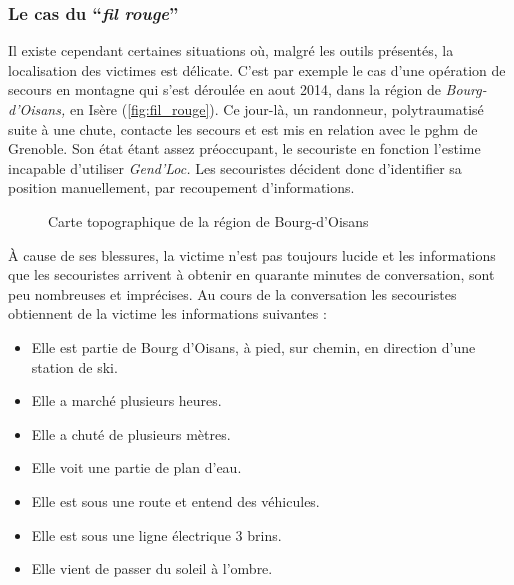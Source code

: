 \subsubsection{Le cas du \enquote{\emph{fil rouge}}}
\label{subsec:1-1-2-3}

Il existe cependant certaines situations où, malgré les outils
présentés, la localisation des victimes est délicate. C'est par
exemple le cas d'une opération de secours en montagne qui s'est
déroulée en aout 2014, dans la région de \emph{Bourg-d'Oisans,} en
Isère (\autoref{fig:fil_rouge}). Ce jour-là, un randonneur,
polytraumatisé suite à une chute, contacte les secours et est mis en
relation avec le \ac{pghm} de Grenoble. Son état étant assez
préoccupant, le secouriste en fonction l'estime incapable d'utiliser
\emph{Gend'Loc.} Les secouristes décident donc d'identifier sa
position manuellement, par recoupement d'informations.

\begin{figure}
  \centering
  
  \caption{Carte topographique de la région de Bourg-d'Oisans}
  \label{fig:fil_rouge}
\end{figure}

À cause de ses blessures, la victime n'est pas toujours lucide et les
informations que les secouristes arrivent à obtenir en quarante
minutes de conversation, sont peu nombreuses et imprécises. Au cours
de la conversation les secouristes obtiennent de la victime les
informations suivantes :

\begin{itemize}
\item Elle est partie de Bourg d'Oisans, à pied, sur chemin, en
  direction d'une station de ski.
\item Elle a marché plusieurs heures.
\item Elle a chuté de plusieurs mètres.
\item Elle voit une partie de plan d'eau.
\item Elle est sous une route et entend des véhicules.
\item Elle est sous une ligne électrique 3 brins.
\item Elle vient de passer du soleil à l'ombre.
\end{itemize}

